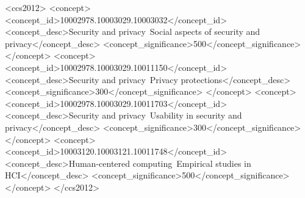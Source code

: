 \begin{abstract}
Large Language Models (LLMs) such as ChatGPT can infer personal attributes from seemingly innocuous text, raising privacy risks beyond memorized data leakage. While prior work has demonstrated these risks, little is known about how users estimate and respond. We conducted a survey with 240 U.S. participants who judged text snippets for inference risks, reported concern levels, and attempted rewrites to block inference. We compared their rewrites with those generated by ChatGPT and Rescriber, a state-of-the-art sanitization tool. Results show that participants struggled to anticipate inference, performing a little better than chance. User rewrites were effective in just 28\% of cases - better than Rescriber but worse than ChatGPT. We examined our participants' rewriting strategies, and observed that while paraphrasing was the most common strategy it is also the least effective; instead abstraction and adding ambiguity were more successful. Our work highlights the importance of inference-aware design in LLM interactions.
\end{abstract}

\begin{CCSXML}
<ccs2012>
   <concept>
       <concept_id>10002978.10003029.10003032</concept_id>
       <concept_desc>Security and privacy~Social aspects of security and privacy</concept_desc>
       <concept_significance>500</concept_significance>
       </concept>
   <concept>
       <concept_id>10002978.10003029.10011150</concept_id>
       <concept_desc>Security and privacy~Privacy protections</concept_desc>
       <concept_significance>300</concept_significance>
       </concept>
   <concept>
       <concept_id>10002978.10003029.10011703</concept_id>
       <concept_desc>Security and privacy~Usability in security and privacy</concept_desc>
       <concept_significance>300</concept_significance>
       </concept>
   <concept>
       <concept_id>10003120.10003121.10011748</concept_id>
       <concept_desc>Human-centered computing~Empirical studies in HCI</concept_desc>
       <concept_significance>500</concept_significance>
       </concept>
 </ccs2012>
\end{CCSXML}

